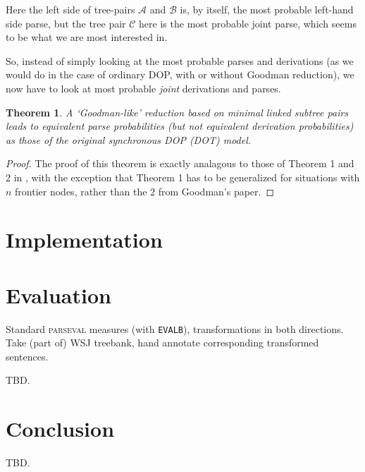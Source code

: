 \documentclass[a4paper]{article}
\newtheorem{theorem}{Theorem}[section]
\theoremstyle{definition}
\begin{document}
Here the left side of tree-pairs $\mathcal{A}$ and $\mathcal{B}$ is, by itself, the
most probable left-hand side parse, but the tree pair $\mathcal{C}$ here is the
most probable joint parse, which seems to be what we are most interested in.

So, instead of simply looking at the most probable parses and derivations (as we would do in the case of ordinary DOP, with or without Goodman reduction), we now have to look at most probable \emph{joint} derivations and parses.

\begin{theorem}
A `Goodman-like' reduction based on minimal linked subtree pairs leads to
equivalent parse probabilities (but not equivalent derivation probabilities) as
those of the original synchronous DOP (DOT) model.
\end{theorem}

\begin{proof}
The proof of this theorem is exactly analagous to those of Theorem 1 and 2 in \citet{goodman2003efficient}, with the exception that Theorem 1 has to be generalized for
situations with $n$ frontier nodes, rather than the $2$ from Goodman's paper.
\end{proof}

\section{Implementation}
\label{sec:implem}

\section{Evaluation}
\label{sec:eval}

Standard \textsc{parseval} measures (with \texttt{EVALB}), transformations in both
directions. Take (part of) WSJ treebank, hand annotate corresponding transformed
sentences.

TBD. 

\section{Conclusion}

TBD.

\label{sec:conc}


%


\end{document}
